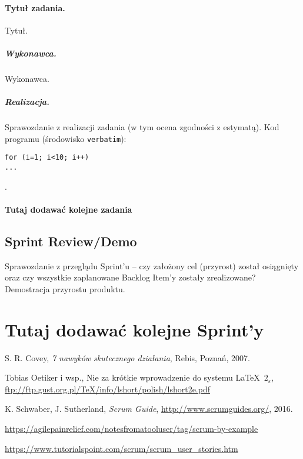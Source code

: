 \documentclass[a4paper]{article}
\begin{document}
\paragraph{Tytuł zadania.} Tytuł.
\subparagraph{Wykonawca.} Wykonawca.
\subparagraph{Realizacja.} Sprawozdanie z realizacji zadania (w tym ocena zgodności z estymatą). Kod programu (środowisko \texttt{verbatim}): \begin{verbatim}
for (i=1; i<10; i++)
...
\end{verbatim}.

\paragraph{Tutaj dodawać kolejne zadania}


\subsection{Sprint Review/Demo}
Sprawozdanie z przeglądu Sprint'u -- czy założony cel (przyrost) został osiągnięty oraz czy wszystkie zaplanowane Backlog Item'y zostały zrealizowane? Demostracja przyrostu produktu.


\section*{Tutaj dodawać kolejne Sprint'y}


\begin{thebibliography}{9}

 S. R. Covey, {\em 7 nawyków skutecznego działania}, Rebis, Poznań, 2007.

 Tobias Oetiker i wsp., Nie za krótkie wprowadzenie do systemu \LaTeX  \ $2_\varepsilon$, \url{ftp://ftp.gust.org.pl/TeX/info/lshort/polish/lshort2e.pdf}

 K. Schwaber, J. Sutherland, {\em Scrum Guide}, \url{http://www.scrumguides.org/}, 2016.

 \url{https://agilepainrelief.com/notesfromatooluser/tag/scrum-by-example}

 \url{https://www.tutorialspoint.com/scrum/scrum_user_stories.htm}

\end{thebibliography}
\end{document}
